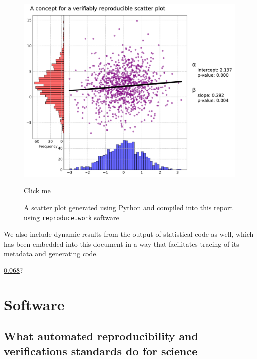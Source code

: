 \begin{figure}[h]
\centering
\begin{minipage}{0.75\textwidth}
\centering
\caption{A scatter plot generated using Python and compiled into this report using \texttt{reproduce.work} software}
\label{fig:scatter}
\includegraphics[width=\textwidth]{../../nbs/img/scatter_plot.pdf}

\hfill {\footnotesize Click me}  \hspace{-1.5mm}$\;$
\end{minipage}
\end{figure}


We also include dynamic results from the output of statistical code as well, which has been embedded into this document in a way that facilitates tracing of its metadata and generating code. 

\hyperlink{reproduce.work}{0.068}?

\hypertarget{software}{%
\section{Software}\label{software}}

\hypertarget{what-automated-reproducibility-and-verifications-standards-do-for-science}{%
\subsection{What automated reproducibility and verifications standards do for science}\label{what-automated-reproducibility-and-verifications-standards-do-for-science}}

